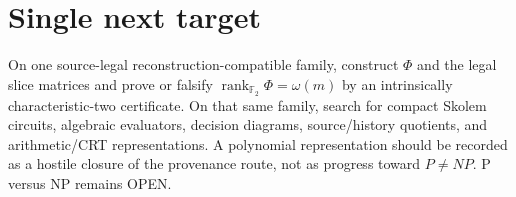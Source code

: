 \documentclass[11pt]{article}
\begin{document}
\section*{Single next target}
On one source-legal reconstruction-compatible family, construct \(\Phi\) and the legal slice
matrices and prove or falsify \(\operatorname{rank}_{\mathbb F_2}\Phi=\omega(m)\) by an
intrinsically characteristic-two certificate. On that same family, search for compact Skolem
circuits, algebraic evaluators, decision diagrams, source/history quotients, and
arithmetic/CRT representations. A polynomial representation should be recorded as a hostile
closure of the provenance route, not as progress toward \(P\neq NP\). P versus NP remains
OPEN.

\end{document}
